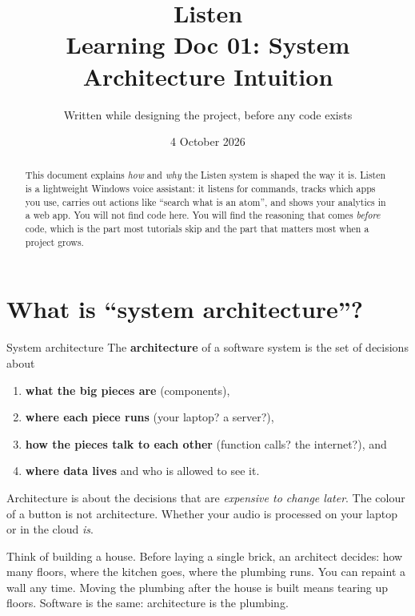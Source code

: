 \documentclass[11pt,a4paper]{article}
\title{\textbf{Listen}\\[4pt]\large Learning Doc 01: System Architecture Intuition}
\author{Written while designing the project, before any code exists}
\date{4 October 2026}
\begin{document}
\maketitle

\begin{abstract}
\noindent This document explains \emph{how} and \emph{why} the Listen system is shaped the
way it is. Listen is a lightweight Windows voice assistant: it listens for commands, tracks
which apps you use, carries out actions like ``search what is an atom'', and shows your
analytics in a web app. You will not find code here. You will find the reasoning that comes
\emph{before} code, which is the part most tutorials skip and the part that matters most when
a project grows.
\end{abstract}

\tableofcontents
\newpage

\section{What is ``system architecture''?}

\begin{concept}{System architecture}
The \textbf{architecture} of a software system is the set of decisions about
\begin{enumerate}[nosep]
  \item \textbf{what the big pieces are} (components),
  \item \textbf{where each piece runs} (your laptop? a server?),
  \item \textbf{how the pieces talk to each other} (function calls? the internet?), and
  \item \textbf{where data lives} and who is allowed to see it.
\end{enumerate}
Architecture is about the decisions that are \emph{expensive to change later}. The colour
of a button is not architecture. Whether your audio is processed on your laptop or in the
cloud \emph{is}.
\end{concept}

\begin{analogy}
Think of building a house. Before laying a single brick, an architect decides: how many
floors, where the kitchen goes, where the plumbing runs. You can repaint a wall any time.
Moving the plumbing after the house is built means tearing up floors. Software is the same:
architecture is the plumbing.
\end{analogy}
\end{document}
